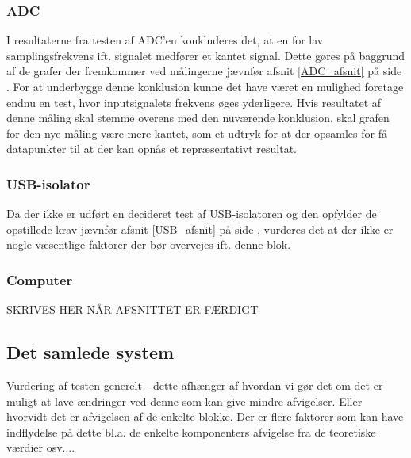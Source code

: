 \subsubsection{ADC}
I resultaterne fra testen af ADC'en konkluderes det, at en for lav samplingsfrekvens ift. signalet medfører et kantet signal. Dette gøres på baggrund af de grafer der fremkommer ved målingerne jævnfør afsnit \ref{ADC_afsnit} på side \pageref{ADC_afsnit}. For at underbygge denne konklusion kunne det have været en mulighed foretage endnu en test, hvor inputsignalets frekvens øges yderligere. Hvis resultatet af denne måling skal stemme overens med den nuværende konklusion, skal grafen for den nye måling være mere kantet, som et udtryk for at der opsamles for få datapunkter til at der kan opnås et repræsentativt resultat.

\subsubsection{USB-isolator}
Da der ikke er udført en decideret test af USB-isolatoren og den opfylder de opstillede krav jævnfør afsnit \ref{USB_afsnit} på side \pageref{USB_afsnit}, vurderes det at der ikke er nogle væsentlige faktorer der bør overvejes ift. denne blok.

\subsubsection{Computer}
SKRIVES HER NÅR AFSNITTET ER FÆRDIGT


 
\subsection{Det samlede system}
Vurdering af testen generelt - dette afhænger af hvordan vi gør det om det er muligt at lave ændringer ved denne som kan give mindre afvigelser. Eller hvorvidt det er afvigelsen af de enkelte blokke. Der er flere faktorer som kan have indflydelse på dette bl.a. de enkelte komponenters afvigelse fra de teoretiske værdier osv....